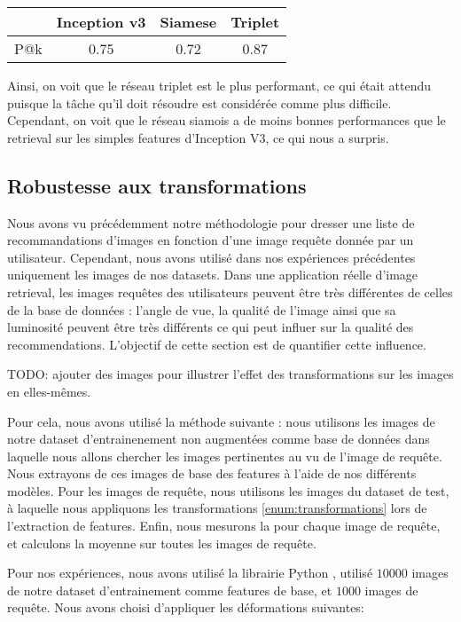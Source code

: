 \begin{tabular}{|l|c|c|c|}
    \hline
    & Inception v3 & Siamese & Triplet \\
    \hline
    P@k & 0.75 & 0.72 & 0.87 \\ 
    \hline
\end{tabular}
 
Ainsi, on voit que le réseau triplet est le plus performant, ce qui était attendu puisque la tâche qu'il doit résoudre
est considérée comme plus difficile. Cependant, on voit que le réseau siamois a de moins bonnes performances que le
retrieval sur les simples features d'Inception V3, ce qui nous a surpris.

\subsection{Robustesse aux transformations}

Nous avons vu précédemment notre méthodologie pour dresser une liste de recommandations d'images en fonction d'une image
requête donnée par un utilisateur. Cependant, nous avons utilisé dans nos expériences précédentes uniquement les images
de nos datasets. Dans une application réelle d'image retrieval, les images requêtes des utilisateurs peuvent être très
différentes de celles de la base de données : l'angle de vue, la qualité de l'image ainsi que sa luminosité peuvent être
très différents ce qui peut influer sur la qualité des recommendations. L'objectif de cette section est de quantifier
cette influence.

TODO: ajouter des images pour illustrer l'effet des transformations sur les images en elles-mêmes.

Pour cela, nous avons utilisé la méthode suivante : nous utilisons les images de notre dataset
d'entrainenement non augmentées comme base de données dans laquelle nous allons chercher les images pertinentes au vu de
l'image de requête. Nous extrayons de ces images de base des features à l'aide de nos différents modèles. 
Pour les images de requête, nous utilisons les images du dataset de test, à laquelle nous appliquons les transformations
\ref{enum:transformations} lors de l'extraction de features. Enfin, nous mesurons la  pour chaque
image de requête, et calculons la moyenne sur toutes les images de requête.
\bigskip

Pour nos expériences, nous avons utilisé la librairie Python \cite{imgaug}, utilisé $10 000$ images de notre dataset
d'entrainement comme features de base, et $1000$ images de requête. Nous avons choisi d'appliquer les d\'eformations
suivantes: 

